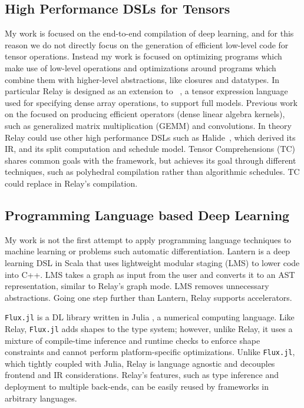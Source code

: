 \subsection{High Performance DSLs for Tensors}

My work is focused on the end-to-end compilation of deep learning, and for
  this reason we do not directly focus on the generation of efficient low-level code for
  tensor operations.
Instead my work is focused on optimizing programs which make use of low-level operations
  and optimizations around programs which combine them with higher-level abstractions,
  like closures and datatypes.
In particular Relay is designed as an extension to \tvm~\citep{tvm_osdi18},
  a tensor expression language used for specifying dense array
  operations, to support full models.
Previous work on the \tvm focused on producing efficient operators
  (dense linear algebra kernels), such as generalized matrix multiplication (GEMM) and convolutions.
In theory Relay could use other high performance DSLs such as Halide~\citep{halide},
    which \tvm derived its IR, and its split computation and schedule model.
Tensor Comprehensions (TC) shares common goals with the \tvm framework, but achieves its goal
through different techniques, such as polyhedral compilation rather than algorithmic
schedules. TC could replace \tvm in Relay{}'s compilation.

\subsection{Programming Language based Deep Learning}

My work is not the first attempt to apply programming language
    techniques to machine learning or problems such automatic differentiation.
Lantern \citep{lantern} is a deep learning DSL in Scala
    that uses lightweight modular staging (LMS) to lower code into C++.
LMS takes a graph as input from the user and converts it to an AST
    representation, similar to Relay's graph mode.
LMS removes unnecessary abstractions.
Going one step further than Lantern,
    Relay supports accelerators.

\verb|Flux.jl| \citep{fluxjl} is a DL library written in Julia \citep{julia}, a numerical
computing language. Like Relay, \verb|Flux.jl| adds shapes to the type system; however, unlike Relay, it
uses a mixture of compile-time inference and runtime checks to enforce shape constraints
\citep{jlmlpl} and cannot perform platform-specific optimizations. Unlike \verb|Flux.jl|, which
tightly coupled with Julia, Relay is language agnostic and decouples frontend and IR
considerations.
Relay's features, such as type inference and deployment to multiple back-ends, can
    be easily reused by frameworks in arbitrary languages.

